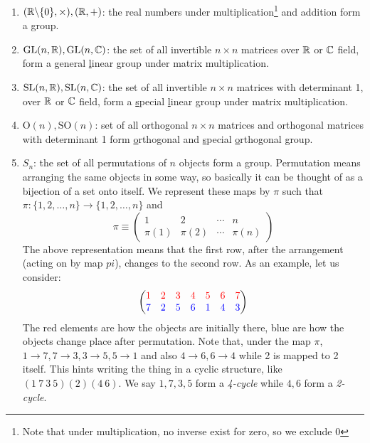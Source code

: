 \begin{enumerate}
    \item $(\mathbb{R}\backslash \{0\}, \times),(\mathbb{R}, +)$: the real numbers under multiplication\footnote{Note that under multiplication, no inverse exist for zero, so we exclude 0} and addition form a group. 
    \item $\mathrm{GL}(n,\mathbb{R}), \mathrm{GL}(n,\mathbb{C})$: the set of all invertible $n\times n$ matrices over $\mathbb{R}$ or $\mathbb{C}$ field, form a \underline{g}eneral \underline{l}inear group under matrix multiplication. 
    \item $\mathrm{SL}(n,\mathbb{R}),\mathrm{SL}(n,\mathbb{C})$: the set of all invertible $n\times n$ matrices with determinant 1, over $\mathbb{R}$ or $\mathbb{C}$ field, form a \underline{s}pecial \underline{l}inear group under matrix multiplication. 
    \item $\mathrm{O}(n),\mathrm{SO}(n)$: set of all orthogonal $n\times n$ matrices and orthogonal matrices with determinant 1 form \underline{o}rthogonal and \underline{s}pecial \underline{o}rthogonal group.
    \item $S_n$: the set of all permutations of $n$ objects form a group.  
    Permutation means arranging the same objects in some way, so basically it can be thought of as a bijection of a set onto itself. We represent these maps by $\pi$ such that $\pi : \{1,2,\ldots,n\}\rightarrow \{1,2,\ldots,n\}$ and 
$$   \pi \equiv 
\begin{pmatrix}
  1         & 2         & \cdots & n \\
  \pi(1) & \pi(2) & \cdots & \pi(n)
\end{pmatrix}$$
The above representation means that the first row, after the arrangement (acting on by map $pi$), changes to the second row. As an example, let us consider: 
$$\begin{pmatrix}
    \mathcolor{red}{1&2&3&4&5&6&7}\\
    \mathcolor{blue}{7&2&5&6&1&4&3}
\end{pmatrix}$$
The red elements are how the objects are initially there, blue are how the objects change place after permutation. Note that, under the map $\pi$, $1\rightarrow 7, 7\rightarrow 3, 3 \rightarrow 5, 5 \rightarrow 1$ and also $4\rightarrow 6, 6\rightarrow 4$ while 2 is mapped to 2 itself. This hints writing the thing in a cyclic structure, like $(1\ 7\ 3\ 5)(2)(4\ 6)$. We say $1,7,3,5$ form a \textit{4-cycle} while $4,6$ form a \textit{2-cycle}. 

\end{enumerate}
